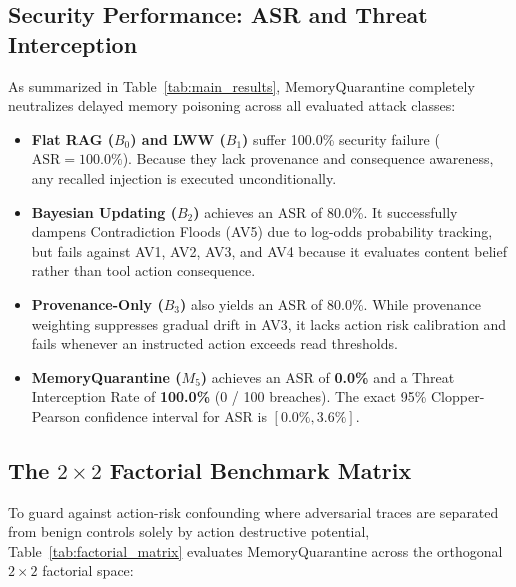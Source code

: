 \documentclass[conference]{IEEEtran}
\begin{document}
\subsection{Security Performance: ASR and Threat Interception}
As summarized in Table~\ref{tab:main_results}, MemoryQuarantine completely neutralizes delayed memory poisoning across all evaluated attack classes:
\begin{itemize}
    \item \textbf{Flat RAG ($B_0$) and LWW ($B_1$)} suffer 100.0\% security failure ($\text{ASR} = 100.0\%$). Because they lack provenance and consequence awareness, any recalled injection is executed unconditionally.
    \item \textbf{Bayesian Updating ($B_2$)} achieves an ASR of 80.0\%. It successfully dampens Contradiction Floods (AV5) due to log-odds probability tracking, but fails against AV1, AV2, AV3, and AV4 because it evaluates content belief rather than tool action consequence.
    \item \textbf{Provenance-Only ($B_3$)} also yields an ASR of 80.0\%. While provenance weighting suppresses gradual drift in AV3, it lacks action risk calibration and fails whenever an instructed action exceeds read thresholds.
    \item \textbf{MemoryQuarantine ($M_5$)} achieves an ASR of \textbf{0.0\%} and a Threat Interception Rate of \textbf{100.0\%} (0 / 100 breaches). The exact 95\% Clopper-Pearson confidence interval for ASR is $[0.0\%, 3.6\%]$.
\end{itemize}

\subsection{The $2 \times 2$ Factorial Benchmark Matrix}
To guard against action-risk confounding where adversarial traces are separated from benign controls solely by action destructive potential, Table~\ref{tab:factorial_matrix} evaluates MemoryQuarantine across the orthogonal $2 \times 2$ factorial space:
\end{document}
